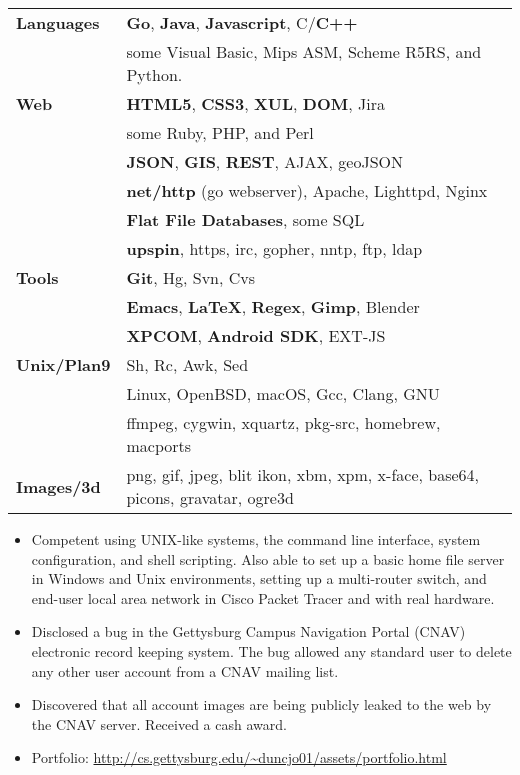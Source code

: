 \documentclass[11pt]{article}
\begin{document}
	\begin{tabular}{ l l }
  	\textbf{Languages} & \textbf{Go}, \textbf{Java}, \textbf{Javascript}, C/\textbf{C++} \\
  	& some Visual Basic, Mips ASM, Scheme R5RS, and Python. \\
  	
  	\textbf{Web} & \textbf{HTML5}, \textbf{CSS3}, \textbf{XUL}, \textbf{DOM}, Jira \\
  	& some Ruby, PHP, and Perl \\
  	& \textbf{JSON}, \textbf{GIS}, \textbf{REST}, AJAX, geoJSON \\
  	& \textbf{net/http} (go webserver), Apache, Lighttpd, Nginx \\
  	& \textbf{Flat File Databases}, some SQL \\
  	& \textbf{upspin}, https, irc, gopher, nntp, ftp, ldap \\
  	
  	\textbf{Tools} & \textbf{Git}, Hg, Svn, Cvs \\
  	& \textbf{Emacs}, \textbf{\LaTeX}, \textbf{Regex}, \textbf{Gimp}, Blender \\
  	& \textbf{XPCOM}, \textbf{Android SDK}, EXT-JS \\
  	
  	\textbf{Unix/Plan9} & Sh, Rc, Awk, Sed \\
  	&Linux, OpenBSD, macOS, Gcc, Clang, GNU \\
  	&ffmpeg, cygwin, xquartz, pkg-src, homebrew, macports \\
  	
  	\textbf{Images/3d} & png, gif, jpeg, blit ikon, xbm, xpm, x-face, base64, picons, gravatar, ogre3d \\
  	
	\end{tabular}
\begin{itemize}
	\item Competent using UNIX-like systems, the command line interface, system configuration, and shell scripting. Also able to set up a basic home file server in Windows and Unix environments, setting up a multi-router switch, and end-user local area network in Cisco Packet Tracer and with real hardware.
	\item Disclosed a bug in the Gettysburg Campus Navigation Portal (CNAV) electronic record keeping system. The bug allowed any standard user to delete any other user account from a CNAV mailing list.
	\item Discovered that all account images are being publicly leaked to the web by the CNAV server. Received a cash award.
	\item Portfolio: \url{http://cs.gettysburg.edu/~duncjo01/assets/portfolio.html}
\end{itemize}
\end{document}
